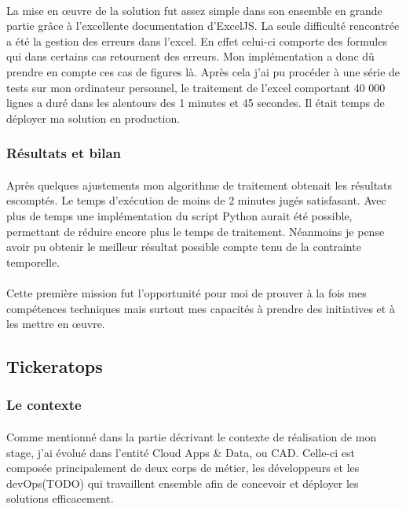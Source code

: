 \documentclass[12pt]{article}
\begin{document}
\begin {sloppypar}
\paragraph{}
La mise en œuvre de la solution fut assez simple dans son ensemble en grande partie 
grâce à l'excellente documentation d'ExcelJS. La seule difficulté rencontrée a été la gestion 
des erreurs dans l'excel. En effet celui-ci comporte des formules qui dans certains cas retournent
des erreurs. Mon implémentation a donc dû prendre en compte ces cas de figures là. Après cela j'ai pu 
procéder à une série de tests sur mon ordinateur personnel, le traitement de l'excel comportant 40 000
lignes a duré dans les alentours des 1 minutes et 45 secondes. Il était temps de déployer ma solution 
en production.
\subsubsection{Résultats et bilan}
\paragraph{}
Après quelques ajustements mon algorithme de traitement obtenait les résultats escomptés.
Le temps d'exécution de moins de 2 minutes jugés satisfasant. 
\linebreak 
Avec plus de temps une implémentation du script Python aurait été possible, permettant de réduire encore
plus le temps de traitement. Néanmoins je pense avoir pu obtenir le meilleur résultat possible 
compte tenu de la contrainte temporelle.
\paragraph{}
Cette première mission fut l'opportunité pour moi de prouver à la fois mes compétences techniques
mais surtout mes capacités à prendre des initiatives et à les mettre en œuvre.

\newpage
\subsection{Tickeratops}
\subsubsection{Le contexte}
\paragraph{}
Comme mentionné dans la partie décrivant le contexte de réalisation de mon stage, j'ai évolué 
dans l'entité Cloud Apps \& Data, ou CAD. Celle-ci est composée principalement de deux corps 
de métier, les développeurs et les devOps(TODO) qui travaillent ensemble afin de concevoir 
et déployer les solutions efficacement.

\end{sloppypar}
\end{document}
